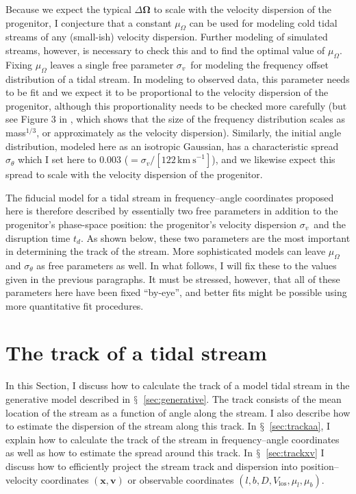 \documentclass[12pt,preprint]{aastex}
\newcommand{\sectionname}{$\mathsection$}
\renewcommand{\vec}[1]{\ensuremath{\mathbf{#1}}}
\newcommand{\vecx}{\ensuremath{\vec{x}}}
\newcommand{\vecv}{\ensuremath{\vec{v}}}
\newcommand{\veco}{\ensuremath{\vec{\Omega}}}
\newcommand{\sigv}{\ensuremath{\sigma_v}}
\newcommand{\kms}{\ensuremath{\,\mathrm{km\ s}^{-1}}}
\newcommand{\vlos}{\ensuremath{V_{\mathrm{los}}}}
\newcommand{\pmll}{\ensuremath{\mu_l}}
\newcommand{\pmbb}{\ensuremath{\mu_b}}
\begin{document}
Because we expect the typical $\Delta\veco$ to scale with the velocity
dispersion of the progenitor, I conjecture that a constant
$\mu_\Omega$ can be used for modeling cold tidal streams of any
(small-ish) velocity dispersion. Further modeling of simulated
streams, however, is necessary to check this and to find the optimal
value of $\mu_\Omega$. Fixing $\mu_\Omega$ leaves a single free
parameter \sigv\ for modeling the frequency offset distribution of a
tidal stream. In modeling to observed data, this parameter needs to be
fit and we expect it to be proportional to the velocity dispersion of
the progenitor, although this proportionality needs to be checked more
carefully (but see Figure 3 in \citealt{Sanders13a}, which shows that
the size of the frequency distribution scales as mass$^{1/3}$, or
approximately as the velocity dispersion). Similarly, the initial
angle distribution, modeled here as an isotropic Gaussian, has a
characteristic spread $\sigma_{\theta}$ which I set here to $0.003$
($=\sigv/[122\kms]$), and we likewise expect this spread to scale with
the velocity dispersion of the progenitor.

The fiducial model for a tidal stream in frequency--angle coordinates
proposed here is therefore described by essentially two free
parameters in addition to the progenitor's phase-space position: the
progenitor's velocity dispersion \sigv\ and the disruption time
$t_d$. As shown below, these two parameters are the most important in
determining the track of the stream. More sophisticated models can
leave $\mu_\Omega$ and $\sigma_{\theta}$ as free parameters as
well. In what follows, I will fix these to the values given in the
previous paragraphs. It must be stressed, however, that all of these
parameters here have been fixed ``by-eye'', and better fits might be
possible using more quantitative fit procedures.


\section{The track of a tidal stream}\label{sec:track}

In this Section, I discuss how to calculate the track of a model tidal
stream in the generative model described in
\sectionname~\ref{sec:generative}. The track consists of the mean
location of the stream as a function of angle along the stream. I also
describe how to estimate the dispersion of the stream along this
track. In \sectionname~\ref{sec:trackaa}, I explain how to calculate
the track of the stream in frequency--angle coordinates as well as how
to estimate the spread around this track. In
\sectionname~\ref{sec:trackxv} I discuss how to efficiently project
the stream track and dispersion into position--velocity coordinates
$(\vecx,\vecv)$ or observable coordinates $(l,b,D,\vlos,\pmll,\pmbb)$.
\end{document}
